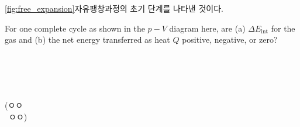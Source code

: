 \freeexpansion
{}%
\autoref{fig:free_expansion}\은 자유팽창과정의 초기 단계를 나타낸 것이다.

\begin{checkbox}
For one complete cycle as shown in the $p-V$ diagram here, are
(a) $\Delta E_{\text{int}}$ for the gas and
(b) the net energy transferred as heat $Q$ positive, negative, or zero? \\
%

\end{checkbox}

\begin{solbox}
\bnset
{} \\
\bn  \\
\bn  \\
\bn  \\
\hspace*{1em} (ㅇㅇ \\
\hspace*{1em} \, ㅇㅇ) \\

 \\
 \\
 \\

\end{solbox}

